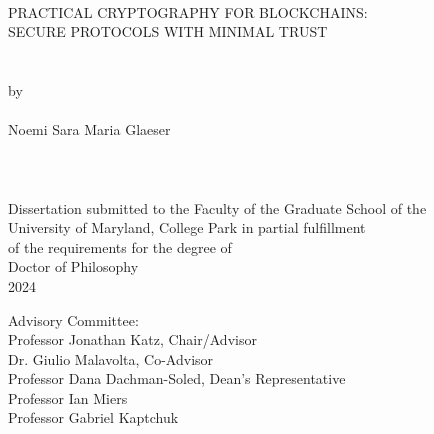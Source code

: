 \hbox{\ }
\vspace{1in}
\begin{center}

\large{{PRACTICAL CRYPTOGRAPHY FOR BLOCKCHAINS:\\
SECURE PROTOCOLS WITH MINIMAL TRUST}}\\
\ \\
\ \\
\large{by} \\
\ \\
\large{Noemi Sara Maria Glaeser}%
\ \\
\ \\
\ \\
\ \\
\normalsize
Dissertation submitted to the Faculty of the Graduate School of the \\
University of Maryland, College Park in partial fulfillment \\
of the requirements for the degree of \\
Doctor of Philosophy \\
2024
\end{center}

\vspace{7.5em}

\noindent Advisory Committee: \\
Professor Jonathan Katz, Chair/Advisor \\
Dr. Giulio Malavolta, Co-Advisor \\
Professor Dana Dachman-Soled, Dean's Representative \\
Professor Ian Miers \\
Professor Gabriel Kaptchuk
